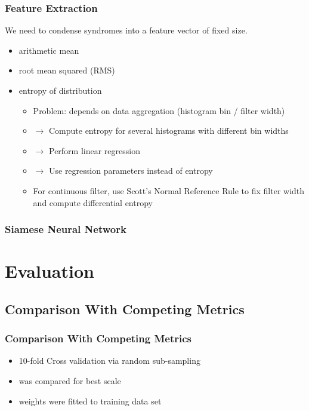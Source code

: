 \documentclass{beamer}
\begin{document}
\begin{frame}
  \frametitle{Feature Extraction}
  We need to condense syndromes into a feature vector of fixed size.
  \begin{itemize}
  \item arithmetic mean
  \item root mean squared (RMS)
  \item entropy of distribution
    \begin{itemize}
    \item Problem: depends on data aggregation (histogram bin / filter width)
    \item $\to$ Compute entropy for several histograms with different bin widths
    \item $\to$ Perform linear regression
    \item $\to$ Use regression parameters instead of entropy
    \item For continuous filter, use Scott's Normal Reference Rule to fix filter width and compute differential entropy
    \end{itemize}
  \end{itemize}
\end{frame}

\begin{frame}
  \frametitle{Siamese Neural Network}
  \begin{center}
    \newcommand*{\ScaleFactor}{0.9}%
    \providecommand*{\SubfigLabelSM}{}%
    \providecommand*{\SubfigLabelGM}{}%
    \newcommand*{\PrimaryColor}{KITblue}%
    \newcommand*{\SecondaryColor}{KITblue}%
    
  \end{center}
\end{frame}

\section{Evaluation}

\subsection{Comparison With Competing Metrics}

\begin{frame}
  \frametitle{Comparison With Competing Metrics}
  \par\vfill
  \begin{itemize}
  \item 10-fold Cross validation via random sub-sampling
  \item {} was compared for best scale
  \item {} weights were fitted to training data set
  \end{itemize}
\end{frame}
\end{document}
